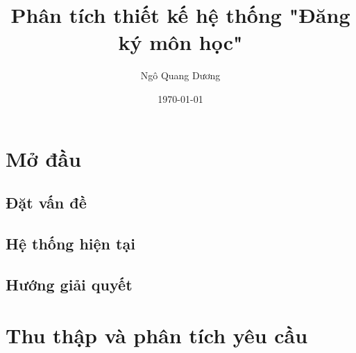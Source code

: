 \documentclass[12pt]{article}
\title{\textbf{Phân tích thiết kế hệ thống "Đăng ký môn học"}}
\author{
  Ngô Quang Dương
}
\date{\today}
\begin{document}
\maketitle

\begin{abstract}
\end{abstract}

\tableofcontents

\section{Mở đầu}

  \subsection{Đặt vấn đề}

  \subsection{Hệ thống hiện tại}

  \subsection{Hướng giải quyết}

\section{Thu thập và phân tích yêu cầu}
  
\end{document}
